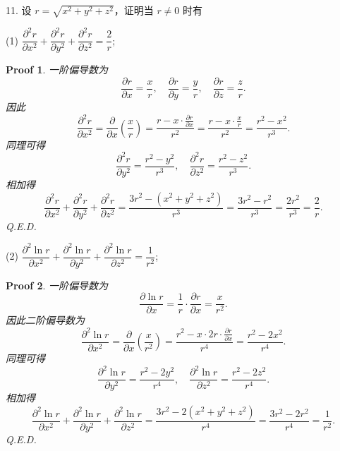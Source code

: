 \documentclass[a4paper,12pt]{article}
\newtheorem*{pf}{Proof}
\begin{document}
11. 设 $r = \sqrt{x^2 + y^2 + z^2}$，证明当 $r \neq 0$ 时有

(1) $\dfrac{\partial^2 r}{\partial x^2} + \dfrac{\partial^2 r}{\partial y^2} + \dfrac{\partial^2 r}{\partial z^2} = \dfrac{2}{r}$;
\begin{pf}
    一阶偏导数为
    $$
        \frac{\partial r}{\partial x} = \frac{x}{r}, \quad \frac{\partial r}{\partial y} = \frac{y}{r}, \quad \frac{\partial r}{\partial z} = \frac{z}{r}.
    $$
    因此
    $$
        \frac{\partial^2 r}{\partial x^2} = \frac{\partial}{\partial x}\left(\frac{x}{r}\right) = \frac{r - x\cdot\frac{\partial r}{\partial x}}{r^2} = \frac{r - x\cdot\frac{x}{r}}{r^2} = \frac{r^2 - x^2}{r^3}.
    $$
    同理可得
    $$
        \frac{\partial^2 r}{\partial y^2} = \frac{r^2 - y^2}{r^3}, \quad \frac{\partial^2 r}{\partial z^2} = \frac{r^2 - z^2}{r^3}.
    $$
    相加得
    $$
        \frac{\partial^2 r}{\partial x^2} + \frac{\partial^2 r}{\partial y^2} + \frac{\partial^2 r}{\partial z^2} = \frac{3r^2 - (x^2+y^2+z^2)}{r^3} = \frac{3r^2 - r^2}{r^3} = \frac{2r^2}{r^3} = \frac{2}{r}.
    $$
    Q.E.D.
\end{pf}

(2) $\dfrac{\partial^2 \ln r}{\partial x^2} + \dfrac{\partial^2 \ln r}{\partial y^2} + \dfrac{\partial^2 \ln r}{\partial z^2} = \dfrac{1}{r^2}$;
\begin{pf}
    一阶偏导数为
    $$
        \frac{\partial \ln r}{\partial x} = \frac{1}{r}\cdot\frac{\partial r}{\partial x} = \frac{x}{r^2}.
    $$
    因此二阶偏导数为
    $$
        \frac{\partial^2 \ln r}{\partial x^2} = \frac{\partial}{\partial x}\left(\frac{x}{r^2}\right) = \frac{r^2 - x\cdot 2r\cdot\frac{\partial r}{\partial x}}{r^4} = \frac{r^2 - 2x^2}{r^4}.
    $$
    同理可得
    $$
        \frac{\partial^2 \ln r}{\partial y^2} = \frac{r^2 - 2y^2}{r^4}, \quad \frac{\partial^2 \ln r}{\partial z^2} = \frac{r^2 - 2z^2}{r^4}.
    $$
    相加得
    $$
        \frac{\partial^2 \ln r}{\partial x^2} + \frac{\partial^2 \ln r}{\partial y^2} + \frac{\partial^2 \ln r}{\partial z^2} = \frac{3r^2 - 2(x^2+y^2+z^2)}{r^4} = \frac{3r^2 - 2r^2}{r^4} = \frac{1}{r^2}.
    $$
    Q.E.D.
\end{pf}
\end{document}
